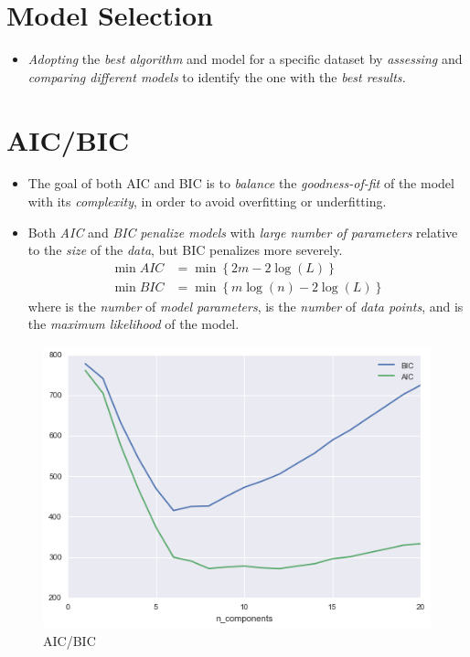 \documentclass[
	number={1},
	title={Machine Learning Fundamentals}
]{cs584notes}
\begin{document}
\section{Model Selection}\label{sec:model-selection}
\begin{itemize}
	\item \emph{Adopting} the \emph{best algorithm} and model for a specific dataset by \emph{assessing} and \emph{comparing different models} to identify the one with the \emph{best results.}
\end{itemize}

\section{AIC/BIC}\label{sec:aic/bic}
\begin{itemize}
	\item The goal of both AIC and BIC is to \emph{balance} the \emph{goodness-of-fit} of the model with its \emph{complexity}, in order to avoid overfitting or underfitting.
	\item Both \emph{AIC} and \emph{BIC} \emph{penalize models} with \emph{large number of parameters} relative to the \emph{size} of the \emph{data}, but BIC penalizes more severely.
	\begin{equation}
		\begin{aligned}
			\min AIC &= \min\left\{ 2m - 2\log(L) \right\}\\
			\min BIC &= \min\left\{ m\log(n) - 2\log(L) \right\}
		\end{aligned}\label{eq:aic-bic}
	\end{equation}
	where  is the \emph{number} of \emph{model parameters},  is the \emph{number} of \emph{data points}, and  is the \emph{maximum likelihood} of the model.
\end{itemize}

\begin{figure}[H]
	\centering
	\includegraphics[width=\textwidth]{figures/1/aic_bic}
	\caption{AIC/BIC}
	\label{fig:aic-bic}
\end{figure}
\end{document}
